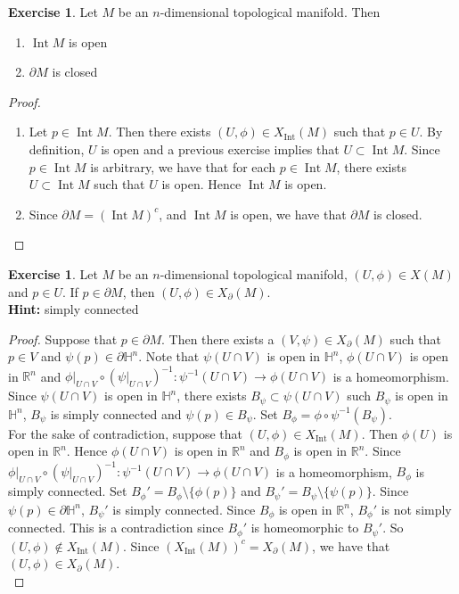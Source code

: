\documentclass{book}
\theoremstyle{definition}
\newtheorem{ex}[definition]{Exercise}
\renewcommand{\H}{\mathbb{H}}
\newcommand{\R}{\mathbb{R}}
\DeclareMathOperator{\Int}{Int}
\DeclareMathOperator*{\0}{\mbf{0}}
\DeclareMathOperator*{\1}{\mbf{1}}
\newcommand{\tbf}[1]{\textbf{#1}}
\newcommand{\p}{\partial}
\begin{document}
	\begin{ex}
		Let $M$ be an $n$-dimensional topological manifold. Then 
		\begin{enumerate}
			\item $\Int M$ is open
			\item $\p M$ is closed
		\end{enumerate}
	\end{ex}
	
	\begin{proof}\
		\begin{enumerate}
			\item Let $p \in \Int M$. Then there exists $(U, \phi) \in X_{\Int}(M)$ such that $p \in U$. By definition, $U$ is open and a previous exercise implies that $U \subset \Int M$. Since $p \in \Int M$ is arbitrary, we have that for each $p \in \Int M$, there exists $U \subset \Int M$ such that $U$ is open. Hence $\Int M$ is open. 
			\item Since $\p M = (\Int M)^c$, and $\Int M$ is open, we have that $\p M$ is closed.
		\end{enumerate}
	\end{proof}

	\begin{ex}
		Let $M$ be an $n$-dimensional topological manifold, $(U, \phi) \in X(M)$ and $p \in U$. If $p \in \partial M$, then $(U, \phi) \in X_{\p}(M)$. \\
		\tbf{Hint:} simply connected
	\end{ex}

	\begin{proof}
		Suppose that $p \in \partial M$. Then there exists a $(V, \psi) \in X_{\p}(M)$ such that $p \in V$ and $\psi(p) \in \partial \H^n$. Note that $\psi(U \cap V)$ is open in $\H^n$, $\phi(U \cap V)$ is open in $\R^n$ and $\phi|_{U \cap V} \circ (\psi|_{U \cap V})^{-1}: \psi^{-1}(U \cap V) \rightarrow \phi(U \cap V)$ is a homeomorphism. \\
		Since $\psi(U \cap V)$ is open in $\H^n$, there exists $B_{\psi} \subset \psi(U \cap V)$ such $B_{\psi}$ is open in $\H^n$, $B_{\psi}$ is simply connected and $\psi(p) \in B_{\psi}$. Set $B_{\phi} = \phi \circ \psi^{-1}(B_{\psi})$. \\
		For the sake of contradiction, suppose that $(U, \phi) \in X_{\Int}(M)$. Then $\phi(U)$ is open in $\R^n$. Hence $\phi(U \cap V)$ is open in $\R^n$ and $B_{\phi}$ is open in $\R^n$. Since $\phi|_{U \cap V} \circ (\psi|_{U \cap V})^{-1}: \psi^{-1}(U \cap V) \rightarrow \phi(U \cap V)$ is a homeomorphism, $B_{\phi}$ is simply connected. Set $B_{\phi}' = B_{\phi} \setminus \{\phi(p)\}$ and $B_{\psi}' = B_{\psi} \setminus \{\psi(p)\}$. Since $\psi(p) \in \p \H^n$, $B_{\psi}'$ is simply connected. Since $B_{\phi}$ is open in $\R^n$, $B_{\phi}'$ is not simply connected. This is a contradiction since $B_{\phi}'$ is homeomorphic to $B_{\psi}'$. So $(U, \phi) \not \in X_{\Int}(M)$. Since $(X_{\Int}(M))^c = X_{\p}(M)$, we have that $(U, \phi) \in X_{\p}(M)$.\\
	\end{proof}
\end{document}
